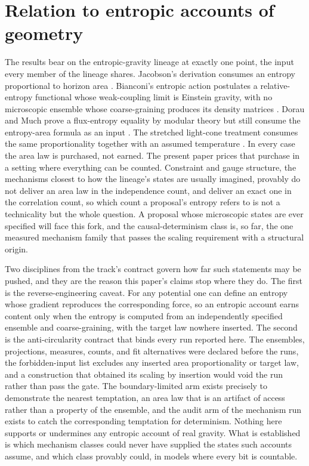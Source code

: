\documentclass[aps,pre,reprint,nofootinbib]{revtex4-2}
\begin{document}
\section{Relation to entropic accounts of geometry}
\label{sec:literature}

The results bear on the entropic-gravity lineage at exactly one point,
the input every member of the lineage shares.  Jacobson's derivation
consumes an entropy proportional to horizon area
\cite{Jacobson1995}.  Bianconi's entropic action postulates a
relative-entropy functional whose weak-coupling limit is Einstein
gravity, with no microscopic ensemble whose coarse-graining produces its
density matrices \cite{Bianconi2025}.  Dorau and Much prove a
flux-entropy equality by modular theory but still consume the
entropy-area formula as an input \cite{DorauMuch2026}.  The stretched
light-cone treatment consumes the same proportionality together with an
assumed temperature \cite{AlonsoSerrano2025}.  In every case the area
law is purchased, not earned.  The present paper prices that purchase in
a setting where everything can be counted.  Constraint and gauge
structure, the mechanisms closest to how the lineage's states are
usually imagined, provably do not deliver an area law in the
independence count, and deliver an exact one in the correlation count,
so which count a proposal's entropy refers to is not a technicality but
the whole question.  A proposal whose microscopic states are ever
specified will face this fork, and the causal-determinism class is, so
far, the one measured mechanism family that passes the scaling
requirement with a structural origin.

Two disciplines from the track's contract govern how far such statements
may be pushed, and they are the reason this paper's claims stop where
they do.  The first is the reverse-engineering caveat.  For any
potential one can define an entropy whose gradient reproduces the
corresponding force, so an entropic account earns content only when the
entropy is computed from an independently specified ensemble and
coarse-graining, with the target law nowhere inserted.  The second is
the anti-circularity contract that binds every run reported here.  The
ensembles, projections, measures, counts, and fit alternatives were
declared before the runs, the forbidden-input list excludes any inserted
area proportionality or target law, and a construction that obtained its
scaling by insertion would void the run rather than pass the gate.  The
boundary-limited arm exists precisely to demonstrate the nearest
temptation, an area law that is an artifact of access rather than a
property of the ensemble, and the audit arm of the mechanism run exists
to catch the corresponding temptation for determinism.  Nothing here supports or
undermines any entropic account of real gravity.  What is established is
which mechanism classes could never have supplied the states such
accounts assume, and which class provably could, in models where every
bit is countable.
\end{document}
